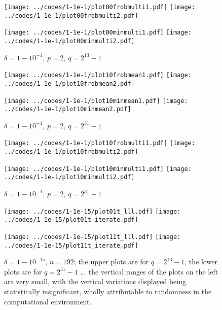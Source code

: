 \documentclass{article}
\begin{document}
\begin{figure}
\begin{centering}
{\texttt{[image: ../codes/1-1e-1/plot00frobmulti1.pdf]}}
{\texttt{[image: ../codes/1-1e-1/plot00frobmulti2.pdf]}}

{\texttt{[image: ../codes/1-1e-1/plot00minmulti1.pdf]}}
{\texttt{[image: ../codes/1-1e-1/plot00minmulti2.pdf]}}

\end{centering}
\caption{$\delta = 1-10^{-1}$, $p = 2$, $q = 2^{13} - 1$}
\end{figure}

\begin{figure}
\begin{centering}
{\texttt{[image: ../codes/1-1e-1/plot10frobmean1.pdf]}}
{\texttt{[image: ../codes/1-1e-1/plot10frobmean2.pdf]}}

{\texttt{[image: ../codes/1-1e-1/plot10minmean1.pdf]}}
{\texttt{[image: ../codes/1-1e-1/plot10minmean2.pdf]}}

\end{centering}
\caption{$\delta = 1-10^{-1}$, $p = 2$, $q = 2^{31} - 1$}
\end{figure}

\begin{figure}
\begin{centering}
{\texttt{[image: ../codes/1-1e-1/plot10frobmulti1.pdf]}}
{\texttt{[image: ../codes/1-1e-1/plot10frobmulti2.pdf]}}

{\texttt{[image: ../codes/1-1e-1/plot10minmulti1.pdf]}}
{\texttt{[image: ../codes/1-1e-1/plot10minmulti2.pdf]}}

\end{centering}
\caption{$\delta = 1-10^{-1}$, $p = 2$, $q = 2^{31} - 1$}
\label{p2err1-1e-1-31}
\end{figure}

\begin{figure}
\begin{centering}
{\texttt{[image: ../codes/1-1e-15/plot01t\_lll.pdf]}}
{\texttt{[image: ../codes/1-1e-15/plot01t\_iterate.pdf]}}

{\texttt{[image: ../codes/1-1e-15/plot11t\_lll.pdf]}}
{\texttt{[image: ../codes/1-1e-15/plot11t\_iterate.pdf]}}

\end{centering}
\caption{$\delta = 1-10^{-15}$, $n = 192$;
         the upper plots are for $q = 2^{13} - 1$,
         the lower plots are for $q = 2^{31} - 1$ \dots\
         the vertical ranges of the plots on the left are very small,
         with the vertical variations displayed
         being statistically insignificant, wholly attributable to randomness
         in the computational environment.}
\label{pstime1-1e-15}
\end{figure}
\end{document}
